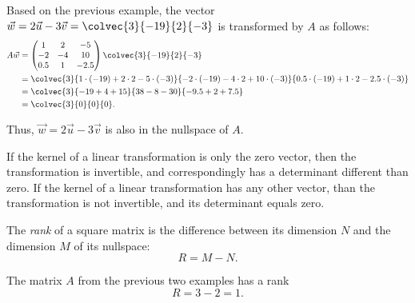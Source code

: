 \begin{example}
  Based on the previous example, the vector $\vec{w} = 2\vec{u}-3\vec{v}=\colvec{3}{-19}{2}{-3}$ is transformed by $A$ as follows:
  \begin{align*}
	A\vec{w} &= \begin{pmatrix} 1 & 2 & -5 \\ -2 & -4 & 10 \\ 0.5 & 1 & -2.5 \end{pmatrix} \colvec{3}{-19}{2}{-3}\\
	& = \colvec{3}{1\cdot(-19)+2\cdot2 - 5\cdot(-3)}{-2\cdot(-19) - 4\cdot2 + 10\cdot(-3)}{0.5\cdot(-19) + 1\cdot2 - 2.5\cdot(-3)}\\
	&= \colvec{3}{-19+4+15}{38-8-30}{-9.5 + 2 + 7.5}\\
	&= \colvec{3}{0}{0}{0}.
  \end{align*}
  
  Thus, $\vec{w}=2\vec{u}-3\vec{v}$ is also in the nullspace of $A$.
\end{example}

If the kernel of a linear transformation is only the zero vector, then the transformation is invertible, and correspondingly has a determinant different than zero. If the kernel of a linear transformation has any other vector, than the transformation is not invertible, and its determinant equals zero.

The \emph{rank} of a square matrix is the difference between its dimension $N$ and the dimension $M$ of its nullspace:
\begin{equation*}
  R = M-N.
\end{equation*}
\begin{example}
  The matrix $A$ from the previous two examples has a rank
  \begin{equation*}
	R = 3-2 = 1.
  \end{equation*}
\end{example}
